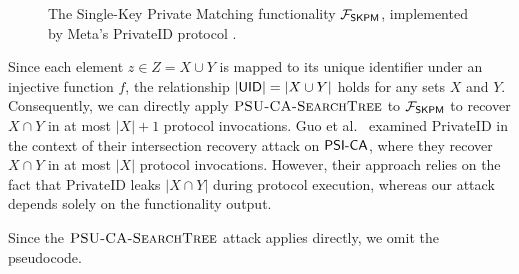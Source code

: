 \begin{figure}[th!]
	\caption{The Single-Key Private Matching functionality $\mathcal{F}_{\mathsf{SKPM}}$, implemented by Meta's PrivateID protocol \cite{PMC}.}\label{fig:SKPM_definition}
\end{figure}


Since each element $z \in Z = X \cup Y$ is mapped to its unique identifier under an injective function $f$, the relationship $|\mathsf{UID}| = |X \cup Y|$ holds for any sets $X$ and $Y$. Consequently, we can directly apply $\textsc{PSU\mbox{-}CA\mbox{-}SearchTree}{}$ to $\mathcal{F}_{\mathsf{SKPM}}$ to recover $X \cap Y$ in at most $|X| + 1$ protocol invocations. Guo et al.~\cite{USENIX:GHLWJL22} examined PrivateID in the context of their intersection recovery attack on $\mathsf{PSI\mbox{-}CA}{}$, where they recover $X \cap Y$ in at most $|X|$ protocol invocations. However, their approach relies on the fact that PrivateID leaks $|X \cap Y|$ during protocol execution, whereas our attack depends solely on the functionality output.

Since the $\textsc{PSU\mbox{-}CA\mbox{-}SearchTree}{}$ attack applies directly, we omit the pseudocode.
